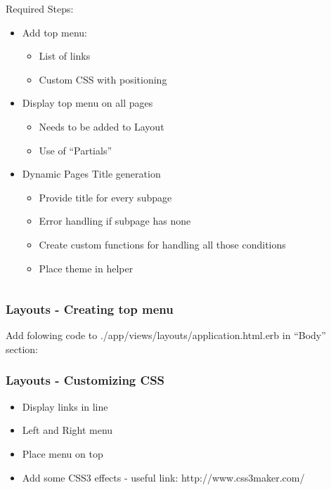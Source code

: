 \documentclass{beamer}
\theoremstyle{mystyle}
\begin{document}
\begin{frame}
\begin{columns}
\begin{column}{0.5\textwidth}
          Required Steps:
          \begin{itemize}
          \item Add top menu:
            \begin{itemize}
            \item List of links
            \item Custom CSS with positioning
            \end{itemize}
          \item Display top menu on all pages
            \begin{itemize}
              \item Needs to be added to Layout
              \item Use of ``Partials''
            \end{itemize}
          \item Dynamic Pages Title generation
            \begin{itemize}
              \item Provide title for every subpage
              \item Error handling if subpage has none
              \item Create custom functions for handling all those conditions
              \item Place theme in helper
            \end{itemize}

          \end{itemize}
    \end{column}
  \end{columns}
\end{frame}

\begin{frame}
  \frametitle{Layouts - Creating top menu}
  Add folowing code to ./app/views/layouts/application.html.erb in ``Body''
  section:
  \railstopmenu
  
\end{frame}

\begin{frame}
  \frametitle{Layouts - Customizing CSS}
  \begin{itemize}
    \item Display links in line 
    \item Left and Right menu
    \item Place menu on top
    \item Add some CSS3 effects - useful link: http://www.css3maker.com/
  \end{itemize}
  
\end{frame}
\end{document}
